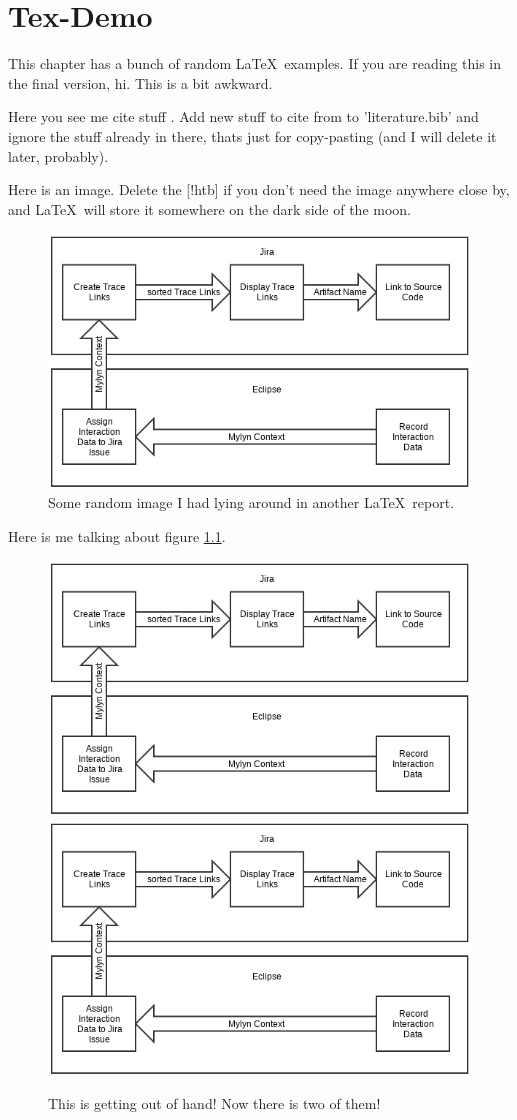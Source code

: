 \chapter{Tex-Demo}

This chapter has a bunch of random \LaTeX\  examples. If you are reading this in the final version, hi. This is a bit awkward.



Here you see me cite stuff \cite{Schneider2004}. Add new stuff to cite from to 'literature.bib' and ignore the stuff already in there, thats just for copy-pasting (and I will delete it later, probably).

Here is an image. Delete the [!htb] if you don't need the image anywhere close by, and \LaTeX\  will store it somewhere on the dark side of the moon.
\begin{figure}[!htb]
	\centering
	\includegraphics[width=.9\linewidth]{images/Approach-Flowchart.png}
	\caption{Some random image I had lying around in another \LaTeX\  report.}
	\label{fig:random_image}
\end{figure}

Here is me talking about figure \ref{fig:random_image}.

\begin{figure}[!htb]
	\centering
	\includegraphics[width=.4\linewidth]{images/Approach-Flowchart.png}
	\quad\includegraphics[width=.4\linewidth]{images/Approach-Flowchart.png}
	\caption{This is getting out of hand! Now there is two of them!}
	\label{fig:lolnooneevenusesthisimage}
\end{figure}


